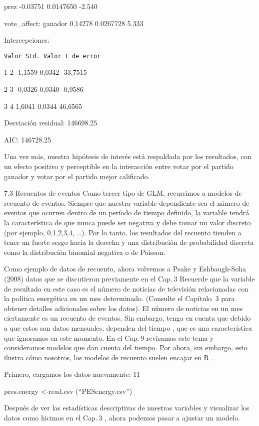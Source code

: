 \documentclass[
]{book}
\begin{document}
prez -0.03751 0.0147650 -2.540

vote\_affect: ganador 0.14278 0.0267728 5.333

Intercepciones:

\begin{verbatim}
Valor Std. Valor t de error
\end{verbatim}

1 \textbar{} 2 -1,1559 0,0342 -33,7515

2 \textbar{} 3 -0,0326 0,0340 -0,9586

3 \textbar{} 4 1,6041 0,0344 46,6565

Desviación residual: 146698.25

AIC: 146728.25

Una vez más, nuestra hipótesis de interés está respaldada por los resultados, con un efecto positivo y perceptible en la interacción entre votar por el partido ganador y votar por el partido mejor calificado.

7.3 Recuentos de eventos
Como tercer tipo de GLM, recurrimos a modelos de recuento de eventos. Siempre que nuestra variable dependiente sea el número de eventos que ocurren dentro de un período de tiempo definido, la variable tendrá la característica de que nunca puede ser negativa y debe tomar un valor discreto (por ejemplo, 0,1,2,3,4, \ldots). Por lo tanto, los resultados del recuento tienden a tener un fuerte sesgo hacia la derecha y una distribución de probabilidad discreta como la distribución binomial negativa o de Poisson.

Como ejemplo de datos de recuento, ahora volvemos a Peake y Eshbaugh-Soha (2008) datos que se discutieron previamente en el Cap. 3 Recuerde que la variable de resultado en este caso es el número de noticias de televisión relacionadas con la política energética en un mes determinado. (Consulte el Capítulo  3 para obtener detalles adicionales sobre los datos). El número de noticias en un mes ciertamente es un recuento de eventos. Sin embargo, tenga en cuenta que debido a que estos son datos mensuales, dependen del tiempo , que es una característica que ignoramos en este momento. En el Cap. 9 revisamos este tema y consideramos modelos que dan cuenta del tiempo. Por ahora, sin embargo, esto ilustra cómo nosotros, los modelos de recuento suelen encajar en R .

Primero, cargamos los datos nuevamente: 11

pres.energy \textless-read.csv (``PESenergy.csv'')

Después de ver las estadísticas descriptivas de nuestras variables y visualizar los datos como hicimos en el Cap. 3 , ahora podemos pasar a ajustar un modelo.
\end{document}
